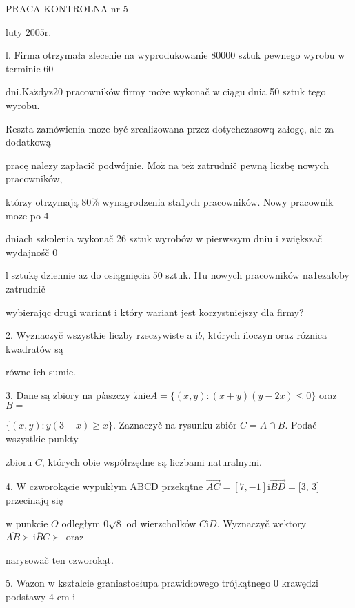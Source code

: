\documentclass[a4paper,12pt]{article}
\begin{document}
PRACA KONTROLNA nr 5

luty $2005\mathrm{r}.$

l. Firma otrzymała zlecenie na wyprodukowanie 80000 sztuk pewnego wyrobu $\mathrm{w}$ terminie 60

$\mathrm{d}\mathrm{n}\mathrm{i}. \mathrm{K}\mathrm{a}\dot{\mathrm{z}}\mathrm{d}\mathrm{y} \mathrm{z} 20$ pracowników firmy $\mathrm{m}\mathrm{o}\dot{\mathrm{z}}\mathrm{e}$ wykonač $\mathrm{w}$ ciągu dnia 50 sztuk tego wyrobu.

Reszta zamówienia $\mathrm{m}\mathrm{o}\dot{\mathrm{z}}\mathrm{e}$ byč zrealizowana przez dotychczasowq załogę, ale za dodatkową

pracę nalezy zapłacič podwójnie. $\mathrm{M}\mathrm{o}\dot{\mathrm{z}}$ na $\mathrm{t}\mathrm{e}\dot{\mathrm{z}}$ zatrudnič pewną liczbę nowych pracowników,

którzy otrzymają 80\% wynagrodzenia sta1ych pracowników. Nowy pracownik $\mathrm{m}\mathrm{o}\dot{\mathrm{z}}\mathrm{e}$ po 4

dniach szkolenia wykonač 26 sztuk wyrobów $\mathrm{w}$ pierwszym dniu $\mathrm{i}$ zwiększač wydajnośč $0$

l sztukę dziennie $\mathrm{a}\dot{\mathrm{z}}$ do osiągnięcia 50 sztuk. I1u nowych pracowników na1ezałoby zatrudnič

wybierajqc drugi wariant $\mathrm{i}$ który wariant jest korzystniejszy dla firmy?

2. Wyznaczyč wszystkie liczby rzeczywiste a $\mathrm{i}b$, których iloczyn oraz róznica kwadratów są

równe ich sumie.

3. Dane są zbiory na p{\it l}aszczy $\acute{\mathrm{z}}\mathrm{n}\mathrm{i}\mathrm{e}A=\{(x,y):(x+y)(y-2x)\leq 0\}$ oraz $B=$

$\{(x,y):y(3-x)\geq x\}$. Zaznaczyč na rysunku zbiór $C=A\cap B$. Podač wszystkie punkty

zbioru $C$, których obie wspólrzędne są liczbami naturalnymi.

4. $\mathrm{W}$ czworokącie wypukłym ABCD przekqtne $\vec{AC}= [7,-1] \mathrm{i} \vec{BD}= [3$, 3$]$ przecinajq się

$\mathrm{w}$ punkcie $O$ odległym $0\sqrt{8}$ od wierzchołków $C\mathrm{i}D$. Wyznaczyč wektory $\overline{AB}\succ \mathrm{i}\overline{B}C\succ$ oraz

narysowač ten czworokąt.

5. Wazon $\mathrm{w}$ ksztalcie graniastosłupa prawidłowego trójkątnego $0$ krawędzi podstawy 4 cm $\mathrm{i}$
\end{document}
